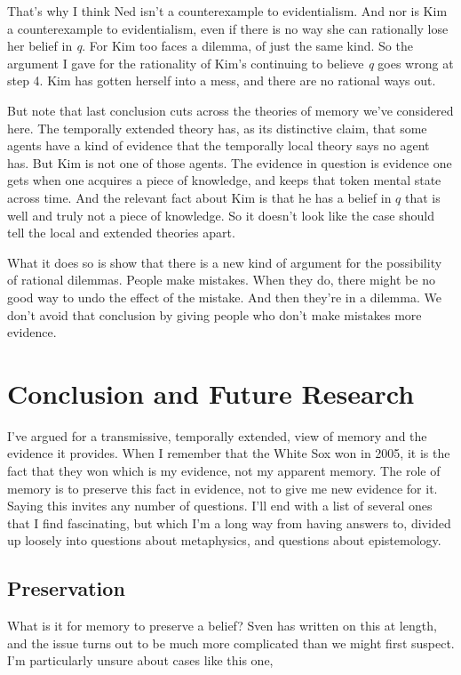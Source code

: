 That's why I think Ned isn't a counterexample to evidentialism. And nor is Kim a counterexample to evidentialism, even if there is no way she can rationally lose her belief in \emph{q}. For Kim too faces a dilemma, of just the same kind. So the argument I gave for the rationality of Kim's continuing to believe \emph{q} goes wrong at step 4. Kim has gotten herself into a mess, and there are no rational ways out.

But note that last conclusion cuts across the theories of memory we've considered here. The temporally extended theory has, as its distinctive claim, that some agents have a kind of evidence that the temporally local theory says no agent has. But Kim is not one of those agents. The evidence in question is evidence one gets when one acquires a piece of knowledge, and keeps that token mental state across time. And the relevant fact about Kim is that he has a belief in $q$ that is well and truly not a piece of knowledge. So it doesn't look like the case should tell the local and extended theories apart.

What it does so is show that there is a new kind of argument for the possibility of rational dilemmas. People make mistakes. When they do, there might be no good way to undo the effect of the mistake. And then they're in a dilemma. We don't avoid that conclusion by giving people who don't make mistakes more evidence. 

\section{Conclusion and Future Research}
\label{conclusionandfutureresearch}

I've argued for a transmissive, temporally extended, view of memory and the evidence it provides. When I remember that the White Sox won in 2005, it is the fact that they won which is my evidence, not my apparent memory. The role of memory is to preserve this fact in evidence, not to give me new evidence for it. Saying this invites any number of questions. I'll end with a list of several ones that I find fascinating, but which I'm a long way from having answers to, divided up loosely into questions about metaphysics, and questions about epistemology.

\subsection{Preservation}
\label{preservation}

What is it for memory to preserve a belief? Sven  \citet{Bernecker2008} has written on this at length, and the issue turns out to be much more complicated than we might first suspect. I'm particularly unsure about cases like this one,

